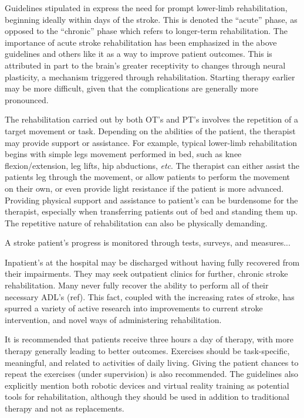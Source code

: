 \documentclass[12pt]{report}
\begin{document}
Guidelines stipulated in \cite{Hebert2016} express the need for prompt lower-limb rehabilitation, beginning ideally within days of the stroke. This is denoted the ``acute'' phase, as opposed to the ``chronic'' phase which refers to longer-term rehabilitation. The importance of acute stroke rehabilitation has been emphasized in the above guidelines and others like it as a way to improve patient outcomes. This is attributed in part to the brain's greater receptivity to changes through neural plasticity, a mechanism triggered through rehabilitation. Starting therapy earlier may be more difficult, given that the complications are generally more pronounced. 

The rehabilitation carried out by both OT's and PT's involves the repetition of a target movement or task. Depending on the abilities of the patient, the therapist may provide support or assistance. For example, typical lower-limb rehabilitation begins with simple legs movement performed in bed, such as knee flexion/extension, leg lifts, hip abductions, \textit{etc}. The therapist can either assist the patients leg through the movement, or allow patients to perform the movement on their own, or even provide light resistance if the patient is more advanced. Providing physical support and assistance to patient's can be burdensome for the therapist, especially when transferring patients out of bed and standing them up. The repetitive nature of rehabilitation can also be physically demanding. 

A stroke patient's progress is monitored through tests, surveys, and measures...

Inpatient's at the hospital may be discharged without having fully recovered from their impairments. They may seek outpatient clinics for further, chronic stroke rehabilitation. Many never fully recover the ability to perform all of their necessary ADL's (ref). This fact, coupled with the increasing rates of stroke, has spurred a variety of active research into improvements to current stroke intervention, and novel ways of administering rehabilitation. 

It is recommended that patients receive three hours a day of therapy, with more therapy generally leading to better outcomes. Exercises should be task-specific, meaningful, and related to activities of daily living. Giving the patient chances to repeat the exercises (under supervision) is also recommended.  The guidelines also explicitly mention both robotic devices and virtual reality training as potential tools for rehabilitation, although they should be used in addition to traditional therapy and not as replacements.  
\end{document}
